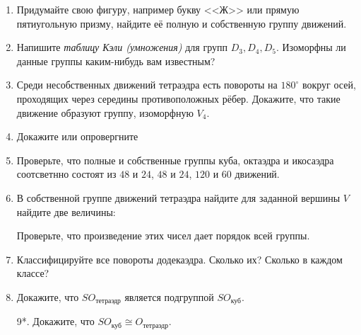 \begin{enumerate}
    \item Придумайте свою фигуру, например букву <<Ж>> или прямую пятиугольную призму, найдите её полную и собственную группу движений. 
    \item Напишите \emph{таблицу Кэли (умножения)} для групп $D_3, D_4, D_5$. Изоморфны ли данные группы каким-нибудь вам известным?
    \item Среди несобственных движений тетраэдра есть повороты на $180^\circ$ вокруг осей, проходящих через середины противоположных рёбер. Докажите, что такие движение образуют группу, изоморфную $V_4$.
    \item Докажите или опровергните
    \item Проверьте, что полные и собственные группы куба, октаэдра и икосаэдра соотсветнно состоят из $48$ и $24$, $48$ и $24$, $120$ и $60$ движений.
    \item В собственной группе движений тетраэдра найдите для заданной вершины $V$ найдите две величины:  
        Проверьте, что произведение этих чисел дает порядок всей группы.

    \item Классифицируйте все повороты додекаэдра. Сколько их? Сколько в каждом классе?

    \item Докажите, что $SO_{\text{тетраэдр}}$ является подгруппой $SO_{\text{куб}}$.
    \item[9*.] Докажите, что $SO_{\text{куб}} \cong O_{\text{тетраэдр}}$.
\end{enumerate}
